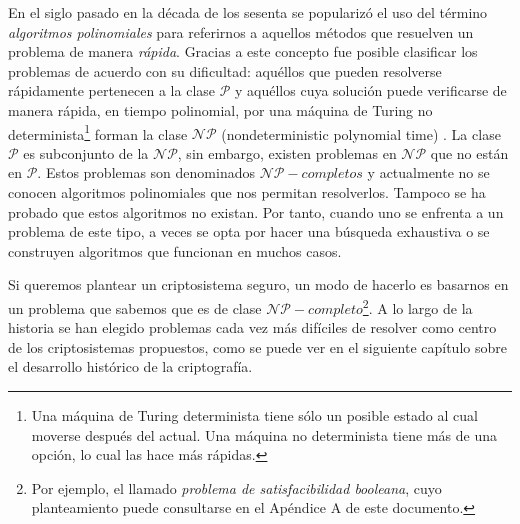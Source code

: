 \bigskip En el siglo pasado en la década de los sesenta se popularizó el uso del término \textit{algoritmos polinomiales} para referirnos a aquellos métodos que resuelven un problema de manera \textit{rápida}. Gracias a este concepto fue posible clasificar los problemas de acuerdo con su dificultad: aquéllos que pueden resolverse rápidamente pertenecen a la clase $\mathcal{P}$ y aquéllos cuya solución puede verificarse de manera rápida, en tiempo polinomial, por una máquina de Turing no determinista\footnote{Una máquina de Turing determinista tiene sólo un posible estado al cual moverse después del actual. Una máquina no determinista tiene más de una opción, lo cual las hace más rápidas.} forman la clase $\mathcal{NP}$ (nondeterministic polynomial time) \cite{cravioto}. La clase $\mathcal{P}$ es subconjunto de la $\mathcal{NP}$, sin embargo, existen problemas en $\mathcal{NP}$ que no están en $\mathcal{P}$. Estos problemas son denominados $\mathcal{NP}-completos$ y actualmente no se conocen algoritmos polinomiales que nos permitan resolverlos. Tampoco se ha probado que estos algoritmos no existan. Por tanto, cuando uno se enfrenta a un problema de este tipo, a veces se opta por hacer una búsqueda exhaustiva o se construyen algoritmos que funcionan en muchos casos.

\bigskip Si queremos plantear un criptosistema seguro, un modo de hacerlo es basarnos en un problema que sabemos que es de clase $\mathcal{NP}-completo$\footnote{Por ejemplo, el llamado \textit{problema de satisfacibilidad booleana}, cuyo planteamiento puede consultarse en el Apéndice A de este documento.}. A lo largo de la historia se han elegido problemas cada vez más difíciles de resolver como centro de los criptosistemas propuestos, como se puede ver en el siguiente capítulo sobre el desarrollo histórico de la criptografía.

